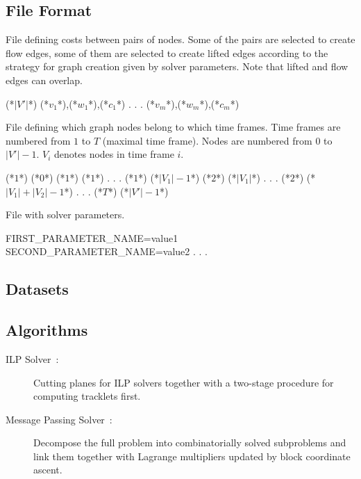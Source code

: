 \subsection{File Format}
File defining costs between pairs of nodes. Some of the pairs are selected to create flow edges, some of them are selected to create lifted edges according to the strategy for graph creation given by solver parameters. Note that lifted and flow edges can overlap. 
\begin{fileformat}
	(*$|V'|$*)
	(*$v_1$*),(*$w_1$*),(*$c_1$*)
	.
	.
	.
	(*$v_m$*),(*$w_m$*),(*$c_m$*) 
\end{fileformat}
File defining which graph nodes belong to which time frames. Time frames are numbered from $1$ to $T$ (maximal time frame). Nodes are numbered from $0$ to $|V'|-1$. $V_i$ denotes nodes in time frame $i$.
\begin{fileformat}
	(*$1$*) (*$0$*)
	(*$1$*) (*$1$*)
	.
	.
	.
	(*$1$*) (*$|V_1|-1$*)
	(*$2$*) (*$|V_1|$*)
	.
	.
	.
	(*$2$*) (*$|V_1|+|V_2|-1$*)
	.
	.
	.
	(*$T$*) (*$|V'|-1$*)
\end{fileformat}
File with solver parameters.
\begin{fileformat}
	[SOLVER]
	FIRST_PARAMETER_NAME=value1
	SECOND_PARAMETER_NAME=value2
	.
	.
	.
\end{fileformat}

\subsection{Datasets}

\subsection{Algorithms}
\begin{description}
    \item[ILP Solver~\cite{hornakova2020lifted}:] Cutting planes for ILP solvers together with a two-stage procedure for computing tracklets first.
    \item[Message Passing Solver~\cite{hornakova2021making}:] Decompose the full problem into combinatorially solved subproblems and link them together with Lagrange multipliers updated by block coordinate ascent.
\end{description}
